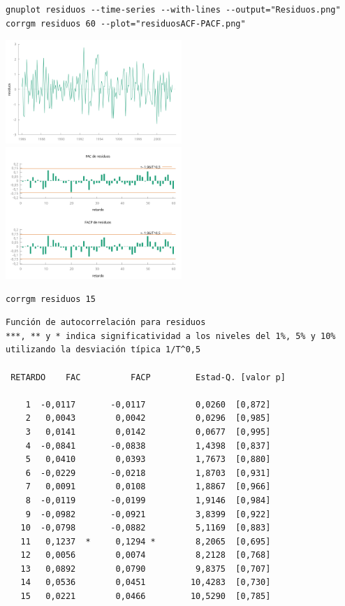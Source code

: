 \documentclass[10pt]{article}
\begin{document}
\begin{verbatim}
gnuplot residuos --time-series --with-lines --output="Residuos.png"
corrgm residuos 60 --plot="residuosACF-PACF.png"
\end{verbatim}

\begin{center}
\includegraphics[width=0.5\textwidth]{./SegundoEjercicioIdentificacionModeloARIMA/Residuos.png}
\includegraphics[width=0.5\textwidth]{./SegundoEjercicioIdentificacionModeloARIMA/residuosACF-PACF.png}
\end{center}

\begin{verbatim}
corrgm residuos 15
\end{verbatim}


\begin{verbatim}
Función de autocorrelación para residuos
***, ** y * indica significatividad a los niveles del 1%, 5% y 10%
utilizando la desviación típica 1/T^0,5

 RETARDO    FAC          FACP         Estad-Q. [valor p]

    1  -0,0117       -0,0117          0,0260  [0,872]
    2   0,0043        0,0042          0,0296  [0,985]
    3   0,0141        0,0142          0,0677  [0,995]
    4  -0,0841       -0,0838          1,4398  [0,837]
    5   0,0410        0,0393          1,7673  [0,880]
    6  -0,0229       -0,0218          1,8703  [0,931]
    7   0,0091        0,0108          1,8867  [0,966]
    8  -0,0119       -0,0199          1,9146  [0,984]
    9  -0,0982       -0,0921          3,8399  [0,922]
   10  -0,0798       -0,0882          5,1169  [0,883]
   11   0,1237  *     0,1294 *        8,2065  [0,695]
   12   0,0056        0,0074          8,2128  [0,768]
   13   0,0892        0,0790          9,8375  [0,707]
   14   0,0536        0,0451         10,4283  [0,730]
   15   0,0221        0,0466         10,5290  [0,785]
\end{verbatim}
\end{document}
